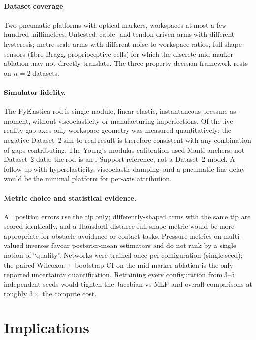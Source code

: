 \paragraph{Dataset coverage.}
\label{sec:disc_lim_data}
Two pneumatic platforms with optical markers, workspaces at most a few hundred millimetres. Untested: cable- and tendon-driven arms with different hysteresis; metre-scale arms with different noise-to-workspace ratios; full-shape sensors (fibre-Bragg, proprioceptive cells) for which the discrete mid-marker ablation may not directly translate. The three-property decision framework rests on $n = 2$ datasets.

\paragraph{Simulator fidelity.}
\label{sec:disc_lim_sim}
The PyElastica rod is single-module, linear-elastic, instantaneous pressure-as-moment, without viscoelasticity or manufacturing imperfections. Of the five reality-gap axes only workspace geometry was measured quantitatively; the negative Dataset~2 sim-to-real result is therefore consistent with any combination of gaps contributing. The Young's-modulus calibration used Manti anchors, not Dataset~2 data; the rod is an I-Support reference, not a Dataset~2 model. A follow-up with hyperelasticity, viscoelastic damping, and a pneumatic-line delay would be the minimal platform for per-axis attribution.

\paragraph{Metric choice and statistical evidence.}
\label{sec:disc_lim_metric}
All position errors use the tip only; differently-shaped arms with the same tip are scored identically, and a Hausdorff-distance full-shape metric would be more appropriate for obstacle-avoidance or contact tasks. Pressure metrics on multi-valued inverses favour posterior-mean estimators and do not rank by a single notion of ``quality''. Networks were trained once per configuration (single seed); the paired Wilcoxon + bootstrap CI on the mid-marker ablation is the only reported uncertainty quantification. Retraining every configuration from $3$--$5$ independent seeds would tighten the Jacobian-vs-MLP and overall comparisons at roughly $3\times$ the compute cost.

\section{Implications}
\label{sec:disc_implications}

